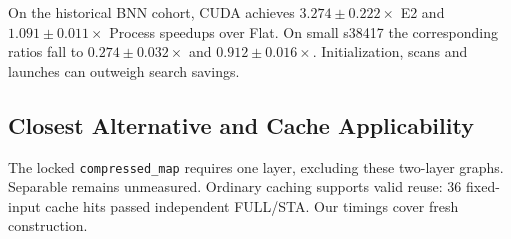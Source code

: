 On the historical BNN cohort, CUDA achieves $3.274\pm0.222\times$ E2 and $1.091\pm0.011\times$ Process speedups over Flat. On small s38417 the corresponding ratios fall to $0.274\pm0.032\times$ and $0.912\pm0.016\times$. Initialization, scans and launches can outweigh search savings.

\subsection{Closest Alternative and Cache Applicability}\label{sec:applicability}
The locked \texttt{compressed\_map} requires one layer, excluding these two-layer graphs. Separable remains unmeasured. Ordinary caching supports valid reuse: 36 fixed-input cache hits passed independent FULL/STA. Our timings cover fresh construction.
